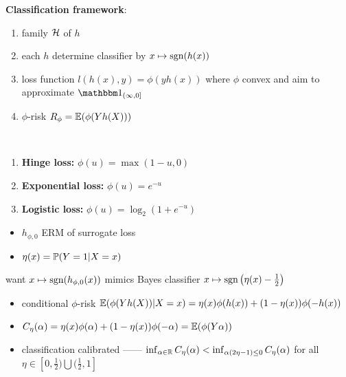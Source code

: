 \begin{setting}
    \textbf{Classification framework}:
    \begin{enumerate}
        \item family $\mathcal{H}$ of $h$
        \item each $h$ determine classifier by $x \mapsto \textnormal{sgn}(h(x))$
        \item loss function $l(h(x), y) = \phi(y h(x))$ where $\phi$ convex and aim to approximate $\In_{(\infty, 0]}$
        \item $\phi$-risk $R_\phi = \mathbb{E}(\phi(Y h(X)))$
    \end{enumerate}
\end{setting}

\begin{example}\,
    \begin{enumerate}
        \item \textbf{Hinge loss:} $\phi(u) = \max(1 - u, 0)$
        \item \textbf{Exponential loss:} $\phi(u) = e^{-u}$
        \item \textbf{Logistic loss:} $\phi(u) = \log_2 (1 + e^{-u})$
    \end{enumerate}
\end{example}

\begin{itemize}
    \item $h_{\phi, 0}$ ERM of surrogate loss
    \item $\eta(x) = \mathbb{P}(Y = 1 | X = x)$
\end{itemize}

\begin{idea}
    want $x \mapsto \textnormal{sgn}({h_{\phi, 0}(x)})$ mimics Bayes classifier $x \mapsto \textnormal{sgn}\left(\eta(x) - \frac{1}{2}\right)$
\end{idea}

\begin{itemize}
    \item conditional $\phi$-risk $\mathbb{E}(\phi(Yh(X)) | X = x) = \eta(x) \phi(h(x)) + (1 - \eta(x))\phi(-h(x))$
    \item $C_\eta(\alpha) = \eta(x) \phi(\alpha) + (1 - \eta(x))\phi(-\alpha) = \mathbb{E}(\phi(Y\alpha))$
    \item classification calibrated ------ $\inf_{\alpha \in \mathbb{R}} C_\eta(\alpha) < \inf_{\alpha(2 \eta - 1) \leq 0} C_\eta (\alpha)$ for all $\eta \in [0, \frac{1}{2}) \bigcup (\frac{1}{2}, 1]$
\end{itemize}


